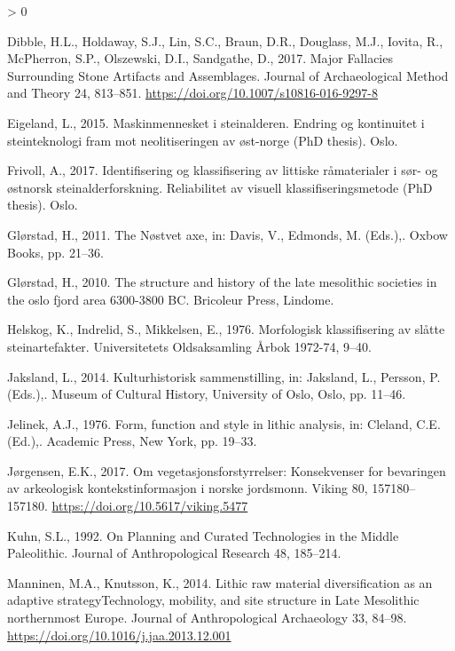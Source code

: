 \documentclass[
]{article}
\newlength{\cslhangindent}
\newenvironment{CSLReferences}[2] %
 {%
  \setlength{\parindent}{0pt}
  \ifodd #1 \everypar{\setlength{\hangindent}{\cslhangindent}}\ignorespaces\fi
  \ifnum #2 > 0
  \setlength{\parskip}{#2\baselineskip}
  \fi
 }%
 {}
\begin{document}
\begin{CSLReferences}{1}{0}
\leavevmode\hypertarget{ref-dibble2017}{}%
Dibble, H.L., Holdaway, S.J., Lin, S.C., Braun, D.R., Douglass, M.J., Iovita, R., McPherron, S.P., Olszewski, D.I., Sandgathe, D., 2017. Major Fallacies Surrounding Stone Artifacts and Assemblages. Journal of Archaeological Method and Theory 24, 813--851. \url{https://doi.org/10.1007/s10816-016-9297-8}

\leavevmode\hypertarget{ref-eigeland2015}{}%
Eigeland, L., 2015. Maskinmennesket i steinalderen. Endring og kontinuitet i steinteknologi fram mot neolitiseringen av øst-norge (PhD thesis). Oslo.

\leavevmode\hypertarget{ref-frivoll2017}{}%
Frivoll, A., 2017. Identifisering og klassifisering av littiske råmaterialer i sør- og østnorsk steinalderforskning. Reliabilitet av visuell klassifiseringsmetode (PhD thesis). Oslo.

\leavevmode\hypertarget{ref-gluxf8rstad2011}{}%
Glørstad, H., 2011. The Nøstvet axe, in: Davis, V., Edmonds, M. (Eds.),. Oxbow Books, pp. 21--36.

\leavevmode\hypertarget{ref-gluxf8rstad2010}{}%
Glørstad, H., 2010. The structure and history of the late mesolithic societies in the oslo fjord area 6300-3800 BC. Bricoleur Press, Lindome.

\leavevmode\hypertarget{ref-helskog1976}{}%
Helskog, K., Indrelid, S., Mikkelsen, E., 1976. Morfologisk klassifisering av slåtte steinartefakter. Universitetets Oldsaksamling Årbok 1972-74, 9--40.

\leavevmode\hypertarget{ref-jaksland2014}{}%
Jaksland, L., 2014. Kulturhistorisk sammenstilling, in: Jaksland, L., Persson, P. (Eds.),. Museum of Cultural History, University of Oslo, Oslo, pp. 11--46.

\leavevmode\hypertarget{ref-jelinek1976}{}%
Jelinek, A.J., 1976. Form, function and style in lithic analysis, in: Cleland, C.E. (Ed.),. Academic Press, New York, pp. 19--33.

\leavevmode\hypertarget{ref-juxf8rgensen2017}{}%
Jørgensen, E.K., 2017. Om vegetasjonsforstyrrelser: Konsekvenser for bevaringen av arkeologisk kontekstinformasjon i norske jordsmonn. Viking 80, 157180--157180. \url{https://doi.org/10.5617/viking.5477}

\leavevmode\hypertarget{ref-kuhn1992}{}%
Kuhn, S.L., 1992. On Planning and Curated Technologies in the Middle Paleolithic. Journal of Anthropological Research 48, 185--214.

\leavevmode\hypertarget{ref-manninen2014}{}%
Manninen, M.A., Knutsson, K., 2014. Lithic raw material diversification as an adaptive strategy{{}}Technology, mobility, and site structure in Late Mesolithic northernmost Europe. Journal of Anthropological Archaeology 33, 84--98. \url{https://doi.org/10.1016/j.jaa.2013.12.001}


\end{CSLReferences}
\end{document}
